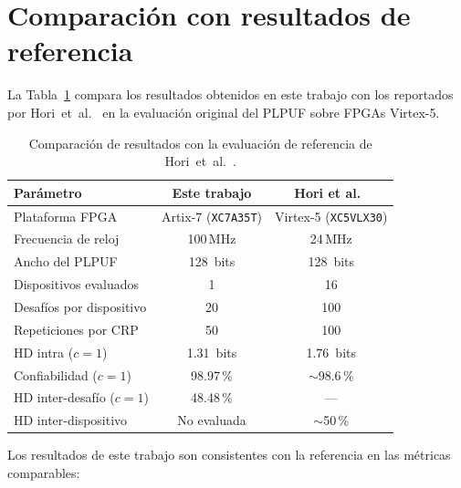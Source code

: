 \section{Comparación con resultados de referencia}
\label{sec:res_comparacion}

La Tabla~\ref{tab:comparacion} compara los resultados obtenidos en este
trabajo con los reportados por Hori~et~al.~\cite{hori_2011_pseudolfsr} en
la evaluación original del PLPUF sobre FPGAs Virtex-5.

\begin{table}[htbp]
\centering
\caption{Comparación de resultados con la evaluación de referencia de
  Hori~et~al.~\cite{hori_2011_pseudolfsr}.}
\label{tab:comparacion}
\small
\renewcommand{\arraystretch}{1.3}
\begin{tabular}{lcc}
\hline
\textbf{Parámetro} &
\textbf{Este trabajo} &
\textbf{Hori et al.~\cite{hori_2011_pseudolfsr}} \\
\hline
Plataforma FPGA       & Artix-7 (\texttt{XC7A35T}) & Virtex-5 (\texttt{XC5VLX30}) \\
Frecuencia de reloj   & 100\,MHz           & 24\,MHz \\
Ancho del PLPUF       & 128~bits           & 128~bits \\
Dispositivos evaluados & 1                 & 16 \\
Desafíos por dispositivo & 20              & 100 \\
Repeticiones por CRP  & 50                 & 100 \\
HD intra ($c=1$)      & 1.31~bits          & 1.76~bits \\
Confiabilidad ($c=1$) & 98.97\,\%          & $\sim$98.6\,\% \\
HD inter-desafío ($c=1$) & 48.48\,\%       & --- \\
HD inter-dispositivo  & No evaluada        & $\sim$50\,\% \\
\hline
\end{tabular}
\end{table}

Los resultados de este trabajo son consistentes con la referencia en las
métricas comparables:

